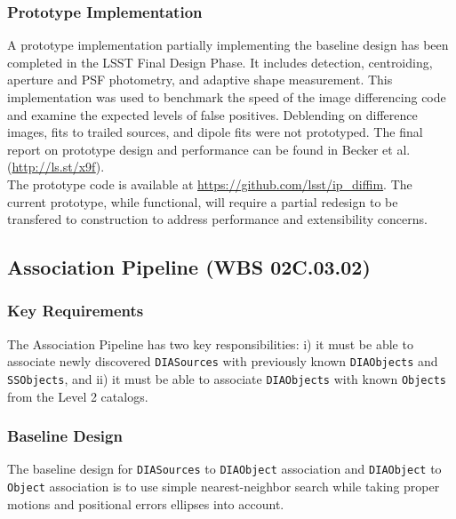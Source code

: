 \documentclass[12pt]{article}
\newcommand{\code}[1]{\texttt{#1}}
\newcommand{\DIASources}{\code{DIASources}\xspace}
\newcommand{\DIAObject}{\code{DIAObject}\xspace}
\newcommand{\DIAObjects}{\code{DIAObjects}\xspace}
\newcommand{\Object}{\code{Object}\xspace}
\newcommand{\Objects}{\code{Objects}\xspace}
\newcommand{\SSObjects}{\code{SSObjects}\xspace}
\newcommand{\wbsAssocP}{WBS 02C.03.02}
\begin{document}
\subsubsection{Prototype Implementation}

A prototype implementation partially implementing the baseline design has been completed in the LSST Final Design Phase. It includes detection, centroiding, aperture and PSF photometry, and adaptive shape measurement.
This implementation was used to benchmark the speed of the image differencing code and examine the expected levels of false positives. Deblending on difference images, fits to trailed sources, and dipole fits were not prototyped. The final report on prototype design and performance can be found in Becker et al. (\url{http://ls.st/x9f}).
\\

The prototype code is available at \url{https://github.com/lsst/ip_diffim}. The current prototype, while functional, will require a partial redesign to be transfered to construction to address performance and extensibility concerns.

\clearpage

\subsection{Association Pipeline (\wbsAssocP)}

\subsubsection{Key Requirements}

The Association Pipeline has two key responsibilities: i) it must be able to associate newly discovered \DIASources with previously known \DIAObjects and \SSObjects, and ii) it must be able to associate \DIAObjects with known \Objects from the Level 2 catalogs.

\subsubsection{Baseline Design}

The baseline design for \DIASources to \DIAObject association and \DIAObject to \Object association is to use simple nearest-neighbor search while taking proper motions and positional errors ellipses into account.
\end{document}
